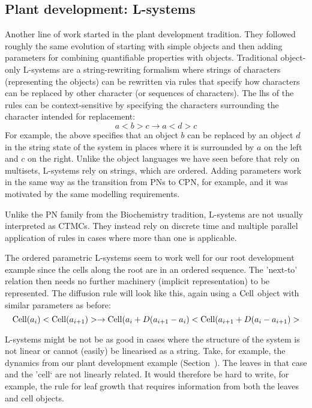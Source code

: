 \subsection{Plant development: L-systems}
\label{subsec:lSystems}
Another line of work started in the plant development tradition.
They followed roughly the same evolution of starting with simple objects and
then adding parameters for combining quantifiable properties with
objects. Traditional object-only L-systems are a string-rewriting formalism
where strings of characters (representing the objects) can be rewritten via
rules that specify how characters can be replaced by other character (or
sequences of characters). The lhs of the rules can be context-sensitive by
specifying the characters surrounding the character intended for replacement:
$$
a< b > c \rightarrow a < d > c
$$
For example, the above specifies that an object $b$ can be replaced by an object
$d$ in the string state of the system in places where it is surrounded by $a$ on
the left and $c$ on the right. Unlike the object languages we have seen before
that rely on multisets, L-systems rely on strings, which are ordered. Adding
parameters work in the same way as the transition from PNs to CPN, for example,
and it was motivated by the same modelling requirements.

Unlike the PN family from the Biochemistry tradition, L-systems are not usually
interpreted as CTMCs. They instead rely on discrete time and multiple parallel
application of rules in cases where more than one is applicable.

The ordered parametric L-systems seem to work well for our root development
example since the cells along the root are in an ordered sequence. The
'next-to' relation then needs no further machinery (implicit representation) to
be represented. The diffusion rule will look like this, again using a
$\mathrm{Cell}$ object with similar parameters as before:
$$
\mathrm{Cell}(a_i)< \mathrm{Cell}(a_{i+1}) > \rightarrow \mathrm{Cell}(a_i+D(a_{i+1}-a_i)< \mathrm{Cell}(a_{i+1}+D(a_i-a_{i+1}) >
$$

L-systems might be not be as good in cases where the structure of the system is
not linear or cannot (easily) be linearised as a string. Take, for example, the
dynamics from our plant development example (Section~). The
leaves in that case and the 'cell` are not linearly related. It would therefore
be hard to write, for example, the rule for leaf growth that requires
information from both the leaves and cell objects.

